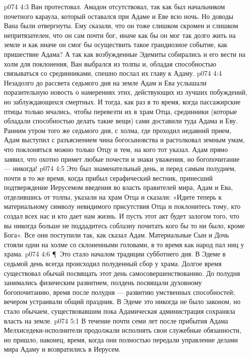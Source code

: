 \vs p074 4:3 Ван протестовал. Амадон отсутствовал, так как был начальником почетного караула, который оставался при Адаме и Еве всю ночь. Но доводы Вана были отвергнуты. Ему сказали, что он тоже слишком скромен и слишком непритязателен, что он сам почти бог, иначе как бы он мог так долго жить на земле и как иначе он смог бы осуществить такое грандиозное событие, как пришествие Адама? А так как возбужденные Эдемиты собирались и его вести на холм для поклонения, Ван выбрался из толпы и, обладая способностью связываться со срединниками, спешно послал их главу к Адаму.
\vs p074 4:4 Незадолго до рассвета седьмого дня на земле Адам и Ева услышали поразительную новость о намерениях этих, действующих из лучших побуждений, но заблуждающихся смертных. И тогда, как раз в то время, когда пассажирские птицы только мчались, чтобы перевезти их в храм Отца, срединники (которые обладали способностью делать такие вещи) сами доставили туда Адама и Еву. Ранним утром того же седьмого дня, с холма, где проходил недавний прием, Адам выступил с разъяснением чина богосыновства и растолковал земным умам, что поклоняться можно только Отцу и тем, на кого тот указал. Адам прямо заявил, что охотно примет любые почести и знаки уважения, но богопочитание --- никогда!
\vs p074 4:5 Это был знаменательный день, и перед самым полуднем, почти в то же время, когда прибыл серафический вестник, принесший подтверждение Иерусемом введения во власть правителей мира, Адам и Ева, отделившись от толпы, указали на храм Отца и сказали: «Идите теперь к материальному символу невидимого присутствия Отца и поклонитесь тому, кто создал всех нас и кто дает нам жизнь. И пусть этот акт будет залогом того, что вы никогда больше не поддадитесь соблазну почитать кого бы то ни было, кроме Бога». Все они поступили так, как сказал Адам. Материальные Сын и Дочь стояли одни на холме со склоненными головами, в то время как народ пал ниц у храма.
\vs p074 4:6 \P\ Это стало началом традиции субботнего дня. В Эдеме в седьмой день всегда происходил полуденный сбор у храма. Долгое время существовал обычай посвящать этот день самосовершенствованию. До полудня занимались физическим развитием, полдень посвящали духовному богопочитанию, время после полудня --- развитию умственных способностей; вечером устраивали общий праздник. В Эдеме это никогда не было законом, но стало обычаем, существовавшим пока Адамическая администрация сохраняла власть на земле.
\vs p074 5:1 В течение почти семи лет после прибытия Адама Мелхиседеки\hyp{}исполнители продолжали исполнять свои служебные обязанности, но пришло, наконец, время, когда они полностью передали управление делами мира Адаму и возвратились в Иерусем.
